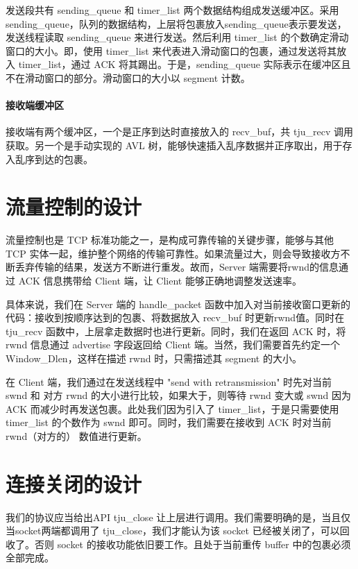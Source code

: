 发送段共有 sending\_queue 和 timer\_list 两个数据结构组成发送缓冲区。采用 sending\_queue，队列的数据结构，上层将包裹放入sending\_queue表示要发送，发送线程读取 sending\_queue 来进行发送。然后利用 timer\_list 的个数确定滑动窗口的大小。即，使用 timer\_list 来代表进入滑动窗口的包裹，通过发送将其放入 timer\_list，通过 ACK 将其踢出。于是，sending\_queue 实际表示在缓冲区且不在滑动窗口的部分。滑动窗口的大小以 segment 计数。

\paragraph*{接收端缓冲区}

接收端有两个缓冲区，一个是正序到达时直接放入的 recv\_buf，共 tju\_recv 调用获取。另一个是手动实现的 AVL 树，能够快速插入乱序数据并正序取出，用于存入乱序到达的包裹。



\section{流量控制的设计}

流量控制也是 TCP 标准功能之一，是构成可靠传输的关键步骤，能够与其他 TCP 实体一起，维护整个网络的传输可靠性。如果流量过大，则会导致接收方不断丢弃传输的结果，发送方不断进行重发。故而，Server 端需要将rwnd的信息通过 ACK 信息携带给 Client 端，让 Client 能够正确地调整发送速率。

具体来说，我们在 Server 端的 handle\_packet 函数中加入对当前接收窗口更新的代码：接收到按顺序达到的包裹、将数据放入 recv\_buf 时更新rwnd值。同时在 tju\_recv 函数中，上层拿走数据时也进行更新。同时，我们在返回 ACK 时，将 rwnd 信息通过 advertise 字段返回给 Client 端。当然，我们需要首先约定一个 Window\_Dlen，这样在描述 rwnd 时，只需描述其 segment 的大小。

在 Client 端，我们通过在发送线程中 "send with retransmission" 时先对当前 swnd 和 对方 rwnd 的大小进行比较，如果大于，则等待 rwnd 变大或 swnd 因为 ACK 而减少时再发送包裹。此处我们因为引入了 timer\_list，于是只需要使用 timer\_list 的个数作为 swnd 即可。同时，我们需要在接收到 ACK 时对当前 rwnd（对方的） 数值进行更新。


\section{连接关闭的设计}

我们的协议应当给出API tju\_close 让上层进行调用。我们需要明确的是，当且仅当socket两端都调用了 tju\_close，我们才能认为该 socket 已经被关闭了，可以回收了。否则 socket 的接收功能依旧要工作。且处于当前重传 buffer 中的包裹必须全部完成。

